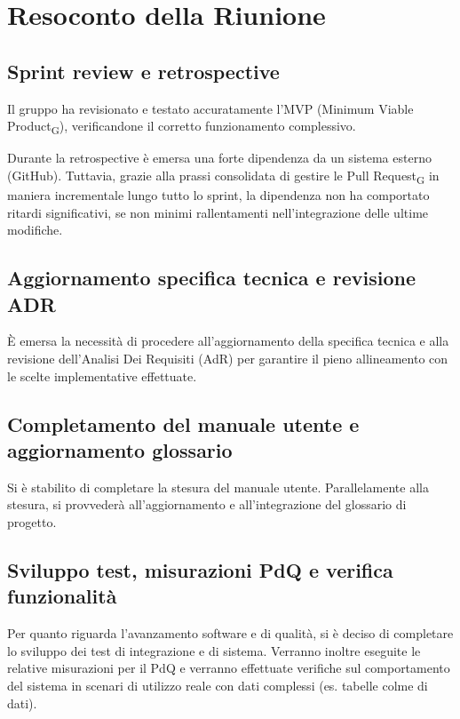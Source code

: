 
\section{Resoconto della Riunione}


\subsection{Sprint review e retrospective}

Il gruppo ha revisionato e testato accuratamente l'MVP (Minimum Viable Product\textsubscript{G}), verificandone il corretto funzionamento complessivo.

Durante la retrospective è emersa una forte dipendenza da un sistema esterno (GitHub). Tuttavia, grazie alla prassi consolidata di gestire le Pull Request\textsubscript{G} in maniera incrementale lungo tutto lo sprint, la dipendenza non ha comportato ritardi significativi, se non minimi rallentamenti nell'integrazione delle ultime modifiche.


\subsection{Aggiornamento specifica tecnica e revisione ADR}

È emersa la necessità di procedere all'aggiornamento della specifica tecnica e alla revisione dell'Analisi Dei Requisiti (AdR) per garantire il pieno allineamento con le scelte implementative effettuate.


\subsection{Completamento del manuale utente e aggiornamento glossario}

Si è stabilito di completare la stesura del manuale utente. Parallelamente alla stesura, si provvederà all'aggiornamento e all'integrazione del glossario di progetto.


\subsection{Sviluppo test, misurazioni PdQ e verifica funzionalità}

Per quanto riguarda l'avanzamento software e di qualità, si è deciso di completare lo sviluppo dei test di integrazione e di sistema. Verranno inoltre eseguite le relative misurazioni per il PdQ e verranno effettuate verifiche sul comportamento del sistema in scenari di utilizzo reale con dati complessi (es. tabelle colme di dati).


